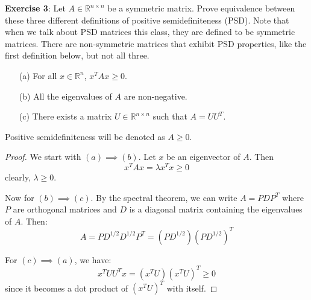\documentclass{article}
\begin{document}
\textbf{Exercise 3}: Let $A \in \mathbb{R}^{n \times n}$ be a symmetric matrix. Prove equivalence between these three different definitions of positive semidefiniteness (PSD). Note that when we talk about PSD matrices this class, they are defined to be symmetric matrices. There are non-symmetric matrices that exhibit PSD properties, like the first definition below, but not all three.
    \begin{itemize}
        \item [(a)] For all $x \in \mathbb{R}^{n}$, $x^{T}Ax \geq 0$.

        \item [(b)] All the eigenvalues of $A$ are non-negative.

        \item [(c)] There exists a matrix $U \in \mathbb{R}^{n \times n}$ such that $A = UU^{T}$.
    \end{itemize}
Positive semidefiniteness will be denoted as $A \geq 0$.
    \begin{proof}
        We start with $(a) \implies (b)$. Let $x$ be an eigenvector of $A$. Then
            \begin{equation*}
                x^{T}Ax = \lambda x^{T}x  \geq 0
            \end{equation*}
        clearly, $\lambda \geq 0$. 

        Now for $(b) \implies (c)$. By the spectral theorem, we can write $A = PDP^{T}$ where $P$ are orthogonal matrices and $D$ is a diagonal matrix containing the eigenvalues of $A$. Then: 
            \begin{equation*}
                A = PD^{1/2}D^{1/2}P^{T} = (PD^{1/2})(PD^{1/2})^{T}
            \end{equation*}

        For $(c) \implies (a)$, we have:
            \begin{equation*}
                x^{T}UU^{T}x = (x^{T}U)(x^{T}U)^{T} \geq 0
            \end{equation*}
        since it becomes a dot product of $(x^{T}U)^{T}$ with itself.
    \end{proof}
\end{document}

